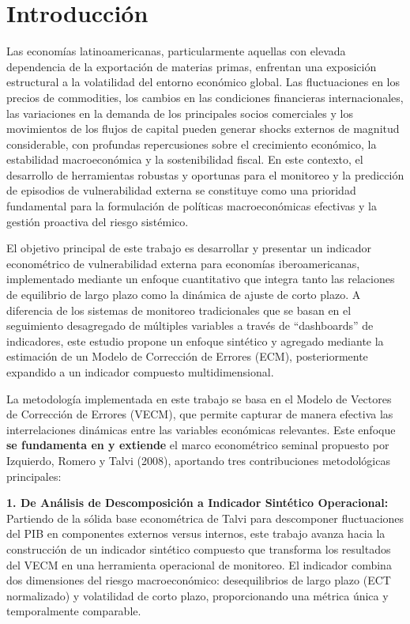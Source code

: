 \documentclass[3p,11pt]{elsarticle}
\begin{document}
\section{Introducción}

Las economías latinoamericanas, particularmente aquellas con elevada dependencia de la exportación de materias primas, enfrentan una exposición estructural a la volatilidad del entorno económico global. Las fluctuaciones en los precios de commodities, los cambios en las condiciones financieras internacionales, las variaciones en la demanda de los principales socios comerciales y los movimientos de los flujos de capital pueden generar shocks externos de magnitud considerable, con profundas repercusiones sobre el crecimiento económico, la estabilidad macroeconómica y la sostenibilidad fiscal. En este contexto, el desarrollo de herramientas robustas y oportunas para el monitoreo y la predicción de episodios de vulnerabilidad externa se constituye como una prioridad fundamental para la formulación de políticas macroeconómicas efectivas y la gestión proactiva del riesgo sistémico.

El objetivo principal de este trabajo es desarrollar y presentar un indicador econométrico de vulnerabilidad externa para economías iberoamericanas, implementado mediante un enfoque cuantitativo que integra tanto las relaciones de equilibrio de largo plazo como la dinámica de ajuste de corto plazo. A diferencia de los sistemas de monitoreo tradicionales que se basan en el seguimiento desagregado de múltiples variables a través de ``dashboards'' de indicadores, este estudio propone un enfoque sintético y agregado mediante la estimación de un Modelo de Corrección de Errores (ECM), posteriormente expandido a un indicador compuesto multidimensional.

La metodología implementada en este trabajo se basa en el Modelo de Vectores de Corrección de Errores (VECM), que permite capturar de manera efectiva las interrelaciones dinámicas entre las variables económicas relevantes. Este enfoque \textbf{se fundamenta en y extiende} el marco econométrico seminal propuesto por Izquierdo, Romero y Talvi (2008), aportando tres contribuciones metodológicas principales:

\textbf{1. De Análisis de Descomposición a Indicador Sintético Operacional:} Partiendo de la sólida base econométrica de Talvi para descomponer fluctuaciones del PIB en componentes externos versus internos, este trabajo avanza hacia la construcción de un indicador sintético compuesto que transforma los resultados del VECM en una herramienta operacional de monitoreo. El indicador combina dos dimensiones del riesgo macroeconómico: desequilibrios de largo plazo (ECT normalizado) y volatilidad de corto plazo, proporcionando una métrica única y temporalmente comparable.
\end{document}
